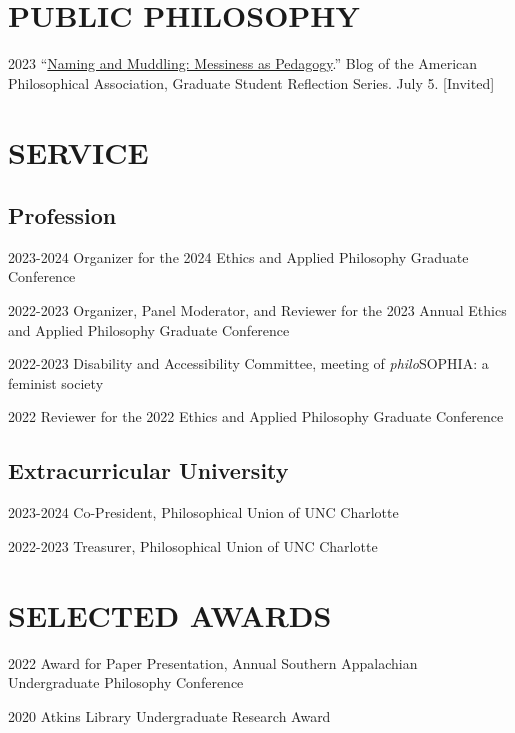 \documentclass{article}
\begin{document}
\section*{\normalsize{\MakeUppercase{Public Philosophy}}}
\begin{tablist}
    \item[2023] \tab{}\enquote{\href{https://blog.apaonline.org/2023/07/05/naming-and-muddling-messiness-as-pedagogy/}{Naming and Muddling: Messiness as Pedagogy}.} Blog of the American Philosophical Association, Graduate Student Reflection Series. July 5. [Invited]
\end{tablist}

\section*{\normalsize{\MakeUppercase{Service}}}
\subsection*{\normalsize{Profession}}
\begin{tablist}
    \item[2023-2024] \tab{}Organizer for the 2024 Ethics and Applied Philosophy Graduate Conference
    \item[2022-2023] \tab{}Organizer, Panel Moderator, and Reviewer for the 2023 Annual Ethics and Applied Philosophy Graduate Conference
    \item[2022-2023] \tab{}Disability and Accessibility Committee,  meeting of \textit{philo}SOPHIA: a feminist society 
    \item[2022] \tab{}Reviewer for the 2022 Ethics and Applied Philosophy Graduate Conference
\end{tablist}
\subsection*{\normalsize{Extracurricular University}}
\begin{tablist}
    \item[2023-2024] \tab{}Co-President, Philosophical Union of UNC Charlotte
    \item[2022-2023] \tab{}Treasurer, Philosophical Union of UNC Charlotte
\end{tablist}

\section*{\normalsize{\MakeUppercase{Selected Awards}}}
\begin{tablist}
    \item[2022] \tab{}Award for Paper Presentation,  Annual Southern Appalachian Undergraduate Philosophy Conference
    \item[2020] \tab{}Atkins Library Undergraduate Research Award
\end{tablist}
\end{document}
